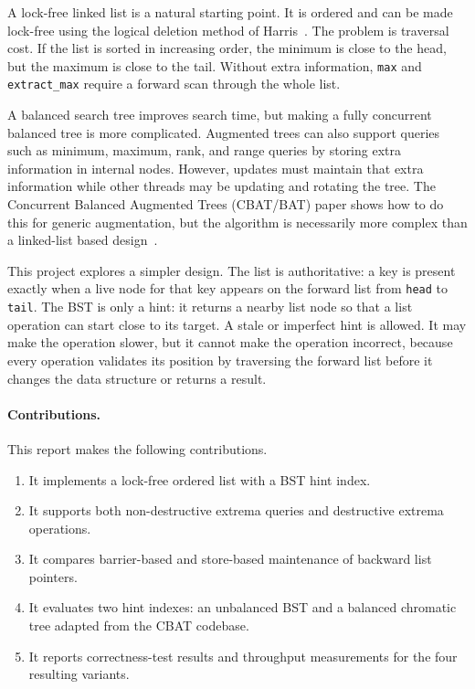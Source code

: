 \documentclass[a4paper,11pt]{article}
\newcommand{\code}[1]{\texttt{#1}}
\begin{document}
A lock-free linked list is a natural starting point. It is ordered and can be made lock-free using the logical deletion method of Harris~\cite{harris2001pragmatic}. The problem is traversal cost. If the list is sorted in increasing order, the minimum is close to the head, but the maximum is close to the tail. Without extra information, \code{max} and \code{extract\_max} require a forward scan through the whole list.

A balanced search tree improves search time, but making a fully concurrent balanced tree is more complicated. Augmented trees can also support queries such as minimum, maximum, rank, and range queries by storing extra information in internal nodes. However, updates must maintain that extra information while other threads may be updating and rotating the tree. The Concurrent Balanced Augmented Trees (CBAT/BAT) paper shows how to do this for generic augmentation, but the algorithm is necessarily more complex than a linked-list based design~\cite{wrench2026cbat}.

This project explores a simpler design. The list is authoritative: a key is present exactly when a live node for that key appears on the forward list from \code{head} to \code{tail}. The BST is only a hint: it returns a nearby list node so that a list operation can start close to its target. A stale or imperfect hint is allowed. It may make the operation slower, but it cannot make the operation incorrect, because every operation validates its position by traversing the forward list before it changes the data structure or returns a result.

\paragraph{Contributions.}
This report makes the following contributions.
\begin{enumerate}
  \item It implements a lock-free ordered list with a BST hint index.
  \item It supports both non-destructive extrema queries and destructive extrema operations.
  \item It compares barrier-based and store-based maintenance of backward list pointers.
  \item It evaluates two hint indexes: an unbalanced BST and a balanced chromatic tree adapted from the CBAT codebase.
  \item It reports correctness-test results and throughput measurements for the four resulting variants.
\end{enumerate}
\end{document}
